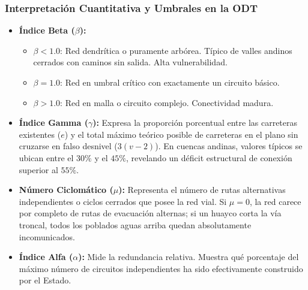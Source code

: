 \documentclass[11pt,a4paper]{article}
\begin{document}
\subsubsection{Interpretación Cuantitativa y Umbrales en la ODT}
\begin{itemize}[leftmargin=*]
    \item \textbf{Índice Beta ($\beta$):} 
    \begin{itemize}
        \item $\beta < 1.0$: Red dendrítica o puramente arbórea. Típico de valles andinos cerrados con caminos sin salida. Alta vulnerabilidad.
        \item $\beta = 1.0$: Red en umbral crítico con exactamente un circuito básico.
        \item $\beta > 1.0$: Red en malla o circuito complejo. Conectividad madura.
    \end{itemize}
    \item \textbf{Índice Gamma ($\gamma$):}
    Expresa la proporción porcentual entre las carreteras existentes ($e$) y el total máximo teórico posible de carreteras en el plano sin cruzarse en falso desnivel ($3(v-2)$). En cuencas andinas, valores típicos se ubican entre el $30\%$ y el $45\%$, revelando un déficit estructural de conexión superior al $55\%$.
    \item \textbf{Número Ciclomático ($\mu$):}
    Representa el número de rutas alternativas independientes o ciclos cerrados que posee la red vial. Si $\mu = 0$, la red carece por completo de rutas de evacuación alternas; si un huayco corta la vía troncal, todos los poblados aguas arriba quedan absolutamente incomunicados.
    \item \textbf{Índice Alfa ($\alpha$):}
    Mide la redundancia relativa. Muestra qué porcentaje del máximo número de circuitos independientes ha sido efectivamente construido por el Estado.
\end{itemize}
\end{document}

